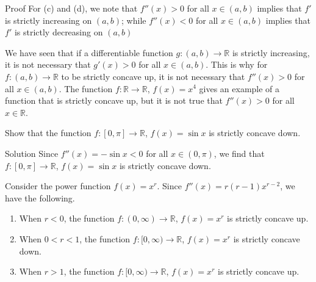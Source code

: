\begin{example}{}
\begin{myproof}{Proof}
For (c) and (d), we note that $f''(x)>0$ for all $x\in (a,b)$ implies that $f'$ is strictly increasing on $(a,b)$; while  $f''(x)<0$ for all $x\in (a,b)$ implies that $f'$ is strictly decreasing on $(a,b)$
\end{myproof}
We have seen that if a differentiable function $g:(a,b)\to\mathbb{R}$ is strictly increasing, it is not necessary that $g'(x)>0$ for all $x\in (a,b)$. This is why for $f:(a,b)\to\mathbb{R}$ to be strictly concave up, it is not necessary that $f''(x)>0$ for all $x\in (a,b)$. The function $f:\mathbb{R}\to\mathbb{R}$, $f(x)=x^4$ gives an example of a function that is strictly concave up, but it is not true that $f''(x)>0$ for all $x\in\mathbb{R}$. 
\begin{example}{}
Show that the function $f:[0, \pi]\to\mathbb{R}$, $f(x)=\sin x$ is strictly concave down.
\end{example}
\begin{solution}{Solution}
Since $f''(x)=-\sin x<0$ for all $x\in (0, \pi)$, we find that $f:[0, \pi]\to\mathbb{R}$, $f(x)=\sin x$ is strictly concave down.
\end{solution}
\begin{example}
{}Consider the power function $f(x)=x^r$. Since $f''(x)=r(r-1)x^{r-2}$, we have the following.
\begin{enumerate}[1.]
\item When $r<0$,  the function $f:(0,\infty)\to\mathbb{R}$, $f(x)=x^r$ is strictly concave up. 
\item When $0<r<1$, the function $f:[0,\infty)\to\mathbb{R}$, $f(x)=x^r$ is strictly concave down. 
\item When $r>1$, the  function $f:[0,\infty)\to\mathbb{R}$, $f(x)=x^r$ is strictly concave up.\end{enumerate}
\end{example}


\end{example}
